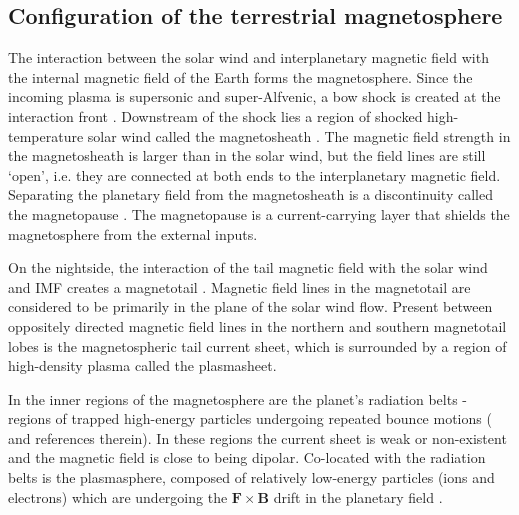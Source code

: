\subsection{Configuration of the terrestrial magnetosphere}
The interaction between the solar wind and interplanetary magnetic field with the internal magnetic field of the Earth forms the magnetosphere. Since the incoming plasma is supersonic and super-Alfvenic, a bow shock is created at the interaction front \cite{Spreiter1966HydromagneticMagnetosphere}. Downstream of the shock lies a region of shocked high-temperature solar wind called the magnetosheath \cite{Lucek2005TheMagnetosheath}. The magnetic field strength in the magnetosheath is larger than in the solar wind, but the field lines are still `open', i.e. they are connected at both ends to the interplanetary magnetic field. Separating the planetary field from the magnetosheath is a discontinuity called the magnetopause \cite{Russell1978InitialObservations,Sonnerup1967MagnetopauseObservations}. The magnetopause is a current-carrying layer that shields the magnetosphere from the external inputs.

On the nightside, the interaction of the tail magnetic field with the solar wind and IMF creates a magnetotail \cite{Hones1984StructureActivity}. Magnetic field lines in the magnetotail are considered to be primarily in the plane of the solar wind flow. Present between oppositely directed magnetic field lines in the northern and southern magnetotail lobes is the magnetospheric tail current sheet, which is surrounded by a region of high-density plasma called the plasmasheet. 

In the inner regions of the magnetosphere are the planet's radiation belts - regions of trapped high-energy particles undergoing repeated bounce motions ( and references therein). In these regions the current sheet is weak or non-existent and the magnetic field is close to being dipolar. Co-located with the radiation belts is the plasmasphere, composed of relatively low-energy particles (ions and electrons) which are undergoing the $\mathbf{F}\times\mathbf{B}$ drift in the planetary field \cite{Lemaire1998ThePlasmasphere}.

